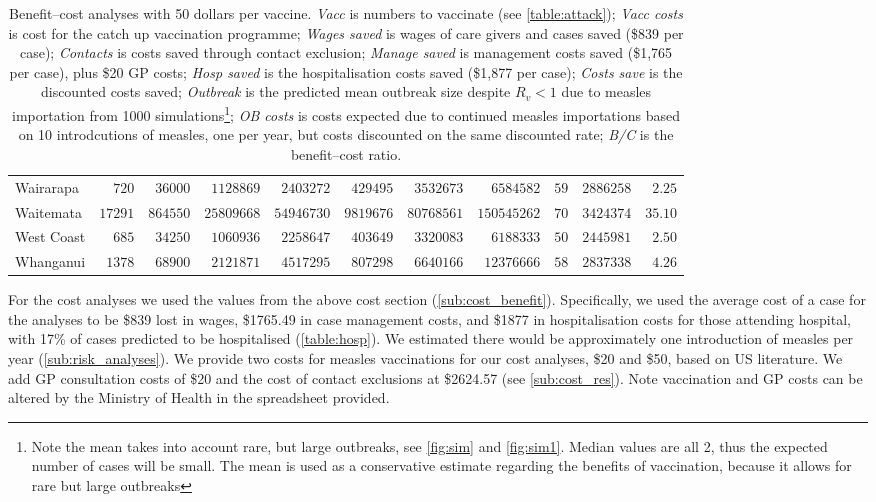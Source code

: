 \documentclass{article}
\begin{document}
\begin{table}
\begin{center}
\begin{tabular}{lrrrrrrrrrr}
Wairarapa&$  720$&$ 36000$&$ 1128869$&$ 2403272$&$  429495$&$ 3532673$&$  6584582$&$ 59$&$2886258$&$ 2.25$\tabularnewline
Waitemata&$17291$&$864550$&$25809668$&$54946730$&$ 9819676$&$80768561$&$150545262$&$ 70$&$3424374$&$35.10$\tabularnewline
West Coast&$  685$&$ 34250$&$ 1060936$&$ 2258647$&$  403649$&$ 3320083$&$  6188333$&$ 50$&$2445981$&$ 2.50$\tabularnewline
Whanganui&$ 1378$&$ 68900$&$ 2121871$&$ 4517295$&$  807298$&$ 6640166$&$ 12376666$&$ 58$&$2837338$&$ 4.26$\tabularnewline
\hline
\end{tabular}\end{center}\caption{Benefit--cost analyses with 50 dollars per vaccine. \textit{Vacc} is numbers to vaccinate (see \autoref{table:attack}); \textit{Vacc costs} is cost for the catch up vaccination programme; \textit{Wages saved} is wages of care givers and cases saved (\$839 per case); \textit{Contacts} is costs saved through contact exclusion; \textit{Manage saved} is management costs saved (\$1,765 per case), plus \$20 GP costs; \textit{Hosp saved} is the hospitalisation costs saved (\$1,877 per case); \textit{Costs save}  is the discounted costs saved; \textit{Outbreak}  is the predicted mean outbreak size despite $R_v < 1$ due to measles importation from 1000 simulations\footnote{Note the mean takes into account rare, but large outbreaks, see \autoref{fig:sim} and \autoref{fig:sim1}. Median values are all 2, thus the expected number of cases will be small. The mean is used as a conservative estimate regarding the benefits of vaccination, because it allows for rare but large outbreaks}; \textit{OB costs}	is costs expected due to continued measles importations based on 10 introdcutions of measles, one per year, but costs discounted on the same discounted rate; \textit{B/C} is the benefit--cost ratio.}
\label{table:cost50}
\end{table}

For the cost analyses we used the values from the above cost section (\autoref{sub:cost_benefit}). Specifically, we used the average cost of a case for the analyses to be \$839 lost in wages, \$1765.49 in case management costs, and \$1877 in hospitalisation costs for those attending hospital, with 17\% of cases predicted to be hospitalised (\autoref{table:hosp}). We estimated there would be approximately one introduction of measles per year (\autoref{sub:risk_analyses}). We provide two costs for measles vaccinations for our cost analyses, \$20 and \$50, based on US literature. We add GP consultation costs of \$20 and the cost of contact exclusions at \$2624.57 (see \autoref{sub:cost_res}). Note vaccination and GP costs can be altered by the Ministry of Health in the spreadsheet provided.
\end{document}
